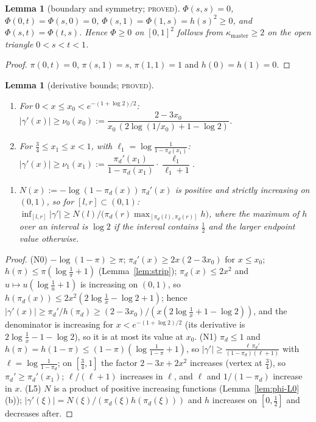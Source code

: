 \documentclass[11pt]{article}
\theoremstyle{plain}
\newtheorem{lemma}[theorem]{Lemma}
\theoremstyle{definition}
\theoremstyle{remark}
\newcommand{\lbl}[1]{\textsc{#1}}
\begin{document}
\begin{lemma}[boundary and symmetry; \lbl{proved}]\label{lem:phi-L3}
$\Phi(s,s)=0$, $\Phi(0,t)=\Phi(s,0)=0$, $\Phi(s,1)=\Phi(1,s)=h(s)^2\ge0$, and
$\Phi(s,t)=\Phi(t,s)$.  Hence $\Phi\ge0$ on $[0,1]^2$ follows from
$\kappa_{\mathrm{master}}\ge2$ on the open triangle $0<s<t<1$.
\end{lemma}
\begin{proof}
$\pi(0,t)=0$, $\pi(s,1)=s$, $\pi(1,1)=1$ and $h(0)=h(1)=0$.
\end{proof}

\begin{lemma}[derivative bounds; \lbl{proved}]\label{lem:phi-L45}
\leavevmode
\begin{enumerate}[label=(N\arabic*),start=0,nosep]
\item For $0<x\le x_0<e^{-(1+\log2)/2}$:
$|\gamma'(x)|\ge\nu_0(x_0):=\dfrac{2-3x_0}{x_0\,(2\log(1/x_0)+1-\log2)}$.
\item For $\tfrac34\le x_1\le x<1$, with $\ell_1=\log\frac1{1-\pi_d(x_1)}$:
$|\gamma'(x)|\ge\nu_1(x_1):=\dfrac{\pi_d'(x_1)}{1-\pi_d(x_1)}\cdot\dfrac{\ell_1}{\ell_1+1}$.
\end{enumerate}
\begin{enumerate}[label=(L5),nosep]
\item $N(x):=-\log(1-\pi_d(x))\,\pi_d'(x)$ is positive and strictly increasing
on $(0,1)$, so for $[l,r]\subset(0,1)$:
$\inf_{[l,r]}|\gamma'|\ge N(l)\big/\bigl(\pi_d(r)\max_{[\pi_d(l),\pi_d(r)]}h\bigr)$,
where the maximum of $h$ over an interval is $\log2$ if the interval
contains $\tfrac12$ and the larger endpoint value otherwise.
\end{enumerate}
\end{lemma}
\begin{proof}
(N0) $-\log(1-\pi)\ge\pi$; $\pi_d'(x)\ge2x(2-3x_0)$ for $x\le x_0$;
$h(\pi)\le\pi(\log\frac1\pi+1)$ (Lemma~\ref{lem:strip}); $\pi_d(x)\le2x^2$ and
$u\mapsto u(\log\frac1u+1)$ is increasing on $(0,1)$, so
$h(\pi_d(x))\le2x^2(2\log\frac1x-\log2+1)$; hence
$|\gamma'(x)|\ge\pi_d'/h(\pi_d)\ge(2-3x_0)/(x(2\log\frac1x+1-\log2))$, and the
denominator is increasing for $x<e^{-(1+\log2)/2}$ (its derivative is
$2\log\frac1x-1-\log2$), so it is at most its value at $x_0$.
(N1) $\pi_d\le1$ and $h(\pi)=h(1-\pi)\le(1-\pi)(\log\frac1{1-\pi}+1)$, so
$|\gamma'|\ge\frac{\ell\,\pi_d'}{(1-\pi_d)(\ell+1)}$ with $\ell=\log\frac1{1-\pi_d}$;
on $[\tfrac34,1]$ the factor $2-3x+2x^2$ increases (vertex at $\tfrac34$), so
$\pi_d'\ge\pi_d'(x_1)$; $\ell/(\ell+1)$ increases in $\ell$, and $\ell$ and
$1/(1-\pi_d)$ increase in $x$.
(L5) $N$ is a product of positive increasing functions
(Lemma~\ref{lem:phi-L0}(b)); $|\gamma'(\xi)|=N(\xi)/(\pi_d(\xi)h(\pi_d(\xi)))$ and
$h$ increases on $[0,\tfrac12]$ and decreases after.
\end{proof}
\end{document}
